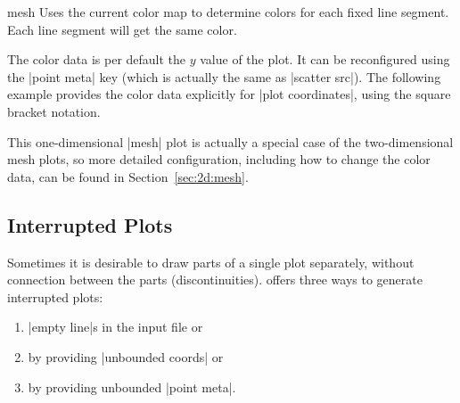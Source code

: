 {\begin{plottype}[/pgfplots]{mesh}
    Uses the current color map to determine colors for each fixed line segment.
    Each line segment will get the same color.
\begin{codeexample}[]
\end{codeexample}
    The color data is per default the $y$ value of the plot. It can be
    reconfigured using the |point meta| key (which is actually the same as
    |scatter src|). The following example provides the color data explicitly
    for |plot coordinates|, using the square bracket notation.
\begin{codeexample}[]
\end{codeexample}
    This one-dimensional |mesh| plot is actually a special case of the
    two-dimensional mesh plots, so more detailed configuration, including how to
    change the color data, can be found in Section~\ref{sec:2d:mesh}.
\end{plottype}


\subsection{Interrupted Plots}
\label{pgfplots:interrupt}

Sometimes it is desirable to draw parts of a single plot separately, without
connection between the parts (discontinuities). \PGFPlots{} offers three ways
to generate interrupted plots:
%
\begin{enumerate}
    \item |empty line|s in the input file or
    \item by providing |unbounded coords| or
    \item by providing unbounded |point meta|.
\end{enumerate}


}
